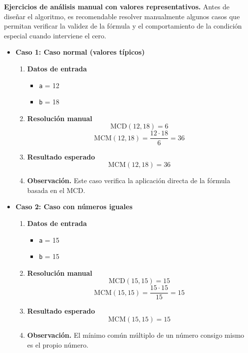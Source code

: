 \documentclass[12pt,twoside]{book}
\begin{document}
						\noindent
						\textbf{Ejercicios de análisis manual con valores representativos.}
						Antes de diseñar el algoritmo, es recomendable resolver manualmente algunos casos que permitan verificar la validez de la fórmula y el comportamiento de la condición especial cuando interviene el cero.
						
						\begin{itemize}
							
							\item \textbf{Caso 1: Caso normal (valores típicos)}
							\begin{enumerate}
								\item \textbf{Datos de entrada}
								\begin{itemize}
									\item \texttt{a} = 12
									\item \texttt{b} = 18
								\end{itemize}
								\item \textbf{Resolución manual}
								\[
								\text{MCD}(12,18)=6
								\]
								\[
								\text{MCM}(12,18)=\frac{12\cdot 18}{6}=36
								\]
								\item \textbf{Resultado esperado}
								\[
								\text{MCM}(12,18)=36
								\]
								\item \textbf{Observación.} Este caso verifica la aplicación directa de la fórmula basada en el MCD.
							\end{enumerate}
							
							\item \textbf{Caso 2: Caso con números iguales}
							\begin{enumerate}
								\item \textbf{Datos de entrada}
								\begin{itemize}
									\item \texttt{a} = 15
									\item \texttt{b} = 15
								\end{itemize}
								\item \textbf{Resolución manual}
								\[
								\text{MCD}(15,15)=15
								\]
								\[
								\text{MCM}(15,15)=\frac{15\cdot 15}{15}=15
								\]
								\item \textbf{Resultado esperado}
								\[
								\text{MCM}(15,15)=15
								\]
								\item \textbf{Observación.} El mínimo común múltiplo de un número consigo mismo es el propio número.
							\end{enumerate}
							

\end{itemize}
\end{document}
